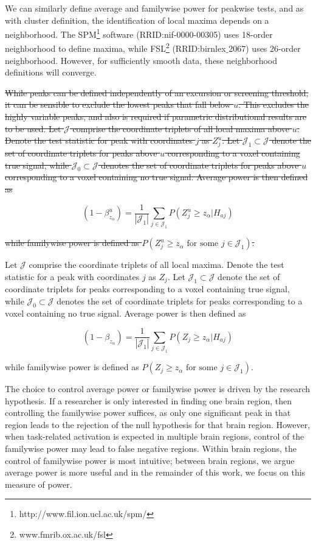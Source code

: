 We can similarly define average and familywise power for peakwise tests, and as with cluster definition, the identification of local maxima depends on a neighborhood.  The SPM\footnote{http://www.fil.ion.ucl.ac.uk/spm/} software (RRID:nif-0000-00305) uses 18-order neighborhood to define maxima, while FSL\footnote{www.fmrib.ox.ac.uk/fsl} (RRID:birnlex$\_$2067) uses 26-order neighborhood.  However, for sufficiently smooth data, these neighborhood definitions will converge.
{\color{Cyan}\st{While peaks can be defined independently of an excursion or screening threshold, it can be sensible to exclude the lowest peaks that fall below $u$.  This excludes the highly variable peaks, and also is required if parametric distributional results are to be used. Let $\mathcal{J}$ comprise the  coordinate triplets of all local maxima above $u$. Denote the test statistic for peak  with coordinates $j$ as  $Z_j^u$.  Let $\mathcal{J}_1 \subset \mathcal{J}$ denote the set of  coordinate triplets for peaks above $u$ corresponding to a voxel containing true signal, while $\mathcal{J}_0 \subset \mathcal{J}$ denotes the set of  coordinate triplets for peaks above $u$ corresponding to a voxel containing no true signal. Average power is then defined as}

\begin{equation}
(1-\beta_{z_\alpha}^u) = \frac{1}{| \mathcal{J}_1 |}\sum_{j \in \mathcal{J}_1}P(Z_j^u \geq z_\alpha | H_{aj}) \label{peak power}
\end{equation}

\st{while familywise power is defined as $P(Z_j^u \geq z_\alpha \text{ for some } j \in \mathcal{J}_1 )$.}

Let $\mathcal{J}$ comprise the  coordinate triplets of all local maxima. Denote the test statistic for a peak  with coordinates $j$ as  $Z_j$.  Let $\mathcal{J}_1 \subset \mathcal{J}$ denote the set of  coordinate triplets for peaks corresponding to a voxel containing true signal, while $\mathcal{J}_0 \subset \mathcal{J}$ denotes the set of  coordinate triplets for peaks corresponding to a voxel containing no true signal. Average power is then defined as

\begin{equation}
(1-\beta_{z_\alpha}) = \frac{1}{| \mathcal{J}_1 |}\sum_{j \in \mathcal{J}_1}P(Z_j \geq z_\alpha | H_{aj}) \label{peak power}
\end{equation}

while familywise power is defined as $P(Z_j \geq z_\alpha \text{ for some } j \in \mathcal{J}_1 )$.}

The choice to control average power or familywise power is driven by the research hypothesis.  If a researcher is only interested in finding one brain region, then controlling the familywise power suffices, as only one significant peak in that region leads to the rejection of the null hypothesis for that brain region.  However, when task-related activation is expected in multiple brain regions, control of the familywise power may lead to false negative regions.  Within brain regions, the control of familywise power is most intuitive; between brain regions, we argue average power is more useful and in the remainder of this work, we focus on this measure of power.
